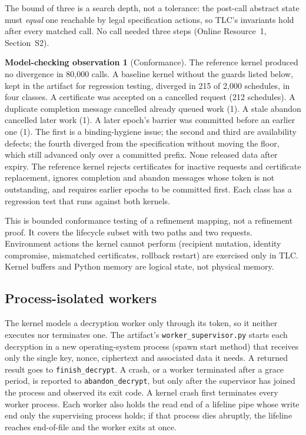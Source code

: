 \documentclass[pdflatex,sn-mathphys-num]{sn-jnl}%
\theoremstyle{plain}
\theoremstyle{definition}
\newtheorem{observation}{Model-checking observation}
\newcommand{\code}[1]{\texttt{#1}}
\begin{document}
The bound of three is a search depth, not a tolerance: the post-call abstract state must \emph{equal} one reachable by legal specification actions, so TLC's invariants hold after every matched call. No call needed three steps (Online Resource~1, Section~S2).

\begin{observation}[Conformance]\label{obs:conformance}
The reference kernel produced no divergence in 80,000 calls. A baseline kernel without the guards listed below, kept in the artifact for regression testing, diverged in 215 of 2,000 schedules, in four classes. A certificate was accepted on a cancelled request (212 schedules). A duplicate completion message cancelled already queued work (1). A stale abandon cancelled later work (1). A later epoch's barrier was committed before an earlier one (1). The first is a binding-hygiene issue; the second and third are availability defects; the fourth diverged from the specification without moving the floor, which still advanced only over a committed prefix. None released data after expiry. The reference kernel rejects certificates for inactive requests and certificate replacement, ignores completion and abandon messages whose token is not outstanding, and requires earlier epochs to be committed first. Each class has a regression test that runs against both kernels.
\end{observation}

This is bounded conformance testing of a refinement mapping, not a refinement proof. It covers the lifecycle subset with two paths and two requests. Environment actions the kernel cannot perform (recipient mutation, identity compromise, mismatched certificates, rollback restart) are exercised only in TLC. Kernel buffers and Python memory are logical state, not physical memory.

\subsection{Process-isolated workers}\label{sec:supervisor}
The kernel models a decryption worker only through its token, so it neither executes nor terminates one. The artifact's \code{worker\_supervisor.py} starts each decryption in a new operating-system process (spawn start method) that receives only the single key, nonce, ciphertext and associated data it needs. A returned result goes to \code{finish\_decrypt}. A crash, or a worker terminated after a grace period, is reported to \code{abandon\_decrypt}, but only after the supervisor has joined the process and observed its exit code. A kernel crash first terminates every worker process. Each worker also holds the read end of a lifeline pipe whose write end only the supervising process holds; if that process dies abruptly, the lifeline reaches end-of-file and the worker exits at once.
\end{document}

